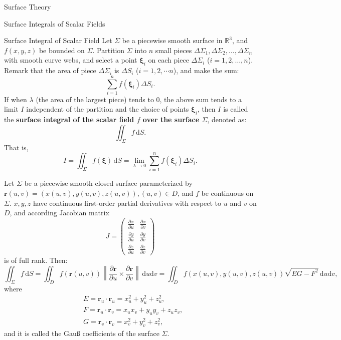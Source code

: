 \documentclass[11pt]{../../TexTemplate/elegantbook}
\begin{document}
\begin{leftbarTitle}{Surface Theory}\end{leftbarTitle}

\begin{leftbarTitle}{Surface Integrals of Scalar Fields}\end{leftbarTitle}
\begin{definition}{Surface Integral of Scalar Field}
    Let \(\Sigma\) be a piecewise smooth surface in \(\mathbb{R}^3\),
    and \(f(x, y, z)\) be bounded on \(\Sigma\).
    Partition \(\Sigma\) into \(n\) small pieces \(\Delta\Sigma_1, \Delta\Sigma_2, \ldots, \Delta\Sigma_n\)
    with smooth curve webs,
    and select a point \(\boldsymbol{\xi}_i\) on each piece \(\Delta\Sigma_i\) (\(i = 1, 2, \ldots, n\)).
    Remark that the area of piece \(\Delta\Sigma_i\) is \(\Delta S_i\) (\(i=1,2,\cdots n\)),
    and make the sum:
    \[
    \sum_{i=1}^{n} f(\boldsymbol{\xi}_i) \Delta S_i.
    \]
    If when \( \lambda \) (the area of the largest piece) tends to \(0\),
    the above sum tends to a limit \(I\) independent of the partition and the choice of points \(\boldsymbol{\xi}_i\),
    then \(I\) is called the \textbf{surface integral of the scalar field \(f\) over the surface \(\Sigma\)},
    denoted as:
    \[
    \iint_{\Sigma} f \, \mathrm{d}S.
    \]
    That is,
    \[
    I = \iint_{\Sigma} f(\boldsymbol{\xi}) \, \mathrm{d}S =
    \lim_{\lambda \to 0} \sum_{i=1}^{n} f(\boldsymbol{\xi}_i) \Delta S_i.
    \]
\end{definition}

\begin{theorem}
    Let \(\Sigma\) be a piecewise smooth closed surface parameterized by 
    \(\mathbf{r}(u, v) = (x(u, v), y(u, v), z(u, v)), (u, v) \in D\),
    and \(f\) be continuous on \(\Sigma\).
    \(x, y, z\) have continuous first-order partial derivatives with respect to \(u\) and \(v\) on \(D\),
    and according Jacobian matrix 
    \[
    J = \begin{pmatrix}
        \frac{\partial x}{\partial u} & \frac{\partial x}{\partial v} \\
        \frac{\partial y}{\partial u} & \frac{\partial y}{\partial v} \\
        \frac{\partial z}{\partial u} & \frac{\partial z}{\partial v}
    \end{pmatrix}
    \]
    is of full rank.
    Then:
    \[
    \iint_{\Sigma} f \, \mathrm{d}S = \iint_{D} f(\mathbf{r}(u, v)) 
    \left\| \frac{\partial \mathbf{r}}{\partial u} \times \frac{\partial \mathbf{r}}{\partial v} \right\| \, \mathrm{d}u \mathrm{d}v
    = \iint_{D} f(x(u, v), y(u, v), z(u, v)) 
    \sqrt{EG-F^{2}} \, \mathrm{d}u \mathrm{d}v,
    \]
    where
    \begin{align*}
        &E = \mathbf{r}_{u} \cdot \mathbf{r}_{u} = x_{u}^2 + y_{u}^2 + z_{u}^2, \\        
        &F = \mathbf{r}_{u} \cdot \mathbf{r}_{v} = x_{u} x_{v} + y_{u} y_{v} + z_{u} z_{v}, \\
        &G = \mathbf{r}_{v} \cdot \mathbf{r}_{v} = x_{v}^2 + y_{v}^2 + z_{v}^2,
    \end{align*}
    and it is called the Gauß coefficients of the surface \(\Sigma\).
\end{theorem}
\end{document}
